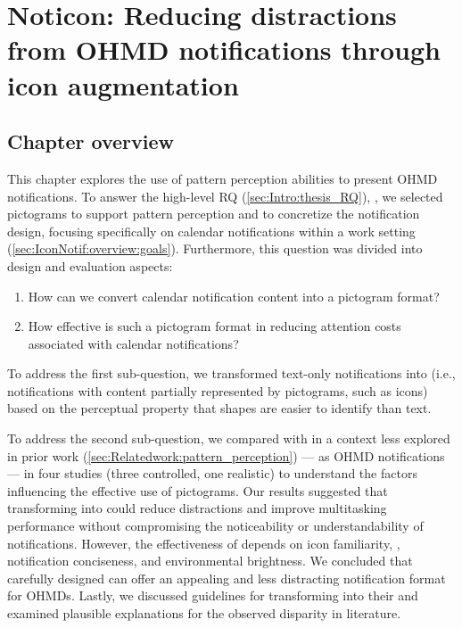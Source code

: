 
\chapter{Noticon: Reducing distractions from OHMD notifications through icon augmentation}
\label{ch:Iconnotif}


\section{Chapter overview}

This chapter explores the use of pattern perception abilities to present OHMD notifications. To answer the high-level RQ (\autoref{sec:Intro:thesis_RQ}), \RQMainIconNotif{}, we selected pictograms to support pattern perception and to concretize the notification design, focusing specifically on calendar notifications within a work setting (\autoref{sec:IconNotif:overview:goals}). Furthermore, this question was divided into design and evaluation aspects:
\begin{enumerate}
    \item How can we convert calendar notification content into a pictogram format?
    \item How effective is such a pictogram format in reducing attention costs associated with calendar notifications?
\end{enumerate}

To address the first sub-question, we transformed text-only notifications into  (i.e., notifications with content partially represented by pictograms, such as icons) based on the perceptual property that shapes are easier to identify than text.

To address the second sub-question, we compared  with  in a context less explored in prior work (\autoref{sec:Relatedwork:pattern_perception}) — as OHMD notifications — in four studies (three controlled, one realistic) to understand the factors influencing the effective use of pictograms. Our results suggested that transforming  into  could reduce distractions and improve multitasking performance without compromising the noticeability or understandability of notifications. However, the effectiveness of \iconnotif{} depends on icon familiarity, \encodingcomplexity{}, notification conciseness, and environmental brightness. We concluded that carefully designed  can offer an appealing and less distracting notification format for OHMDs. Lastly, we discussed guidelines for transforming  into their \iconformat{} and examined plausible explanations for the observed disparity in literature.

